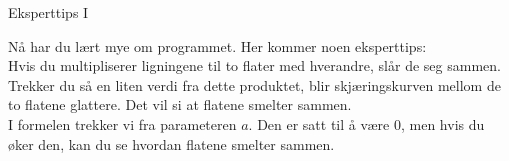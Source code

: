 \documentclass[no]{./../../common/SurferDesc}%
\begin{document}
\footnotesize
%

\begin{surferPage}
  \begin{surferTitle}Eksperttips I\end{surferTitle}
   \begin{surferText}
Nå har du lært mye om programmet. Her kommer noen eksperttips:\\
\vspace{0.3cm}
Hvis du multipliserer ligningene til to flater med hverandre, slår de seg sammen. Trekker du så en liten verdi fra dette produktet, blir skjæringskurven mellom de to flatene glattere. Det vil si at flatene smelter sammen.\\
\vspace{0.3cm}
I formelen trekker vi fra parameteren $a$. Den er satt til å være $0$, men hvis du øker den, kan du se hvordan flatene smelter sammen. 
   \end{surferText}
\end{surferPage}

 
\end{document}
